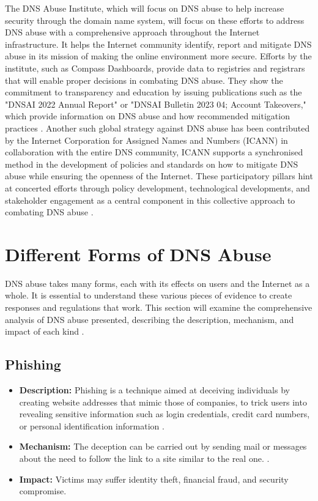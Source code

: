 The DNS Abuse Institute, which will focus on DNS abuse to help increase security through the domain name system, will focus on these efforts to address DNS abuse with a comprehensive approach throughout the Internet infrastructure. It helps the Internet community identify, report and mitigate DNS abuse in its mission of making the online environment more secure. Efforts by the institute, such as Compass Dashboards, provide data to registries and registrars that will enable proper decisions in combating DNS abuse. They show the commitment to transparency and education by issuing publications such as the "DNSAI 2022 Annual Report" or "DNSAI Bulletin 2023 04; Account Takeovers," which provide information on DNS abuse and how recommended mitigation practices \cite{dnsabuseinstitute2023}. Another such global strategy against DNS abuse has been contributed by the Internet Corporation for Assigned Names and Numbers (ICANN)\cite{icann2022dnsabuse} in collaboration with the entire DNS community, ICANN supports a synchronised method in the development of policies and standards on how to mitigate DNS abuse while ensuring the openness of the Internet. These participatory pillars hint at concerted efforts through policy development, technological developments, and stakeholder engagement as a central component in this collective approach to combating DNS abuse \cite{dnsai2022report}. 



\section{Different Forms of DNS Abuse}

DNS abuse takes many forms, each with its effects on users and the Internet as a whole. It is essential to understand these various pieces of evidence to create responses and regulations that work. This section will examine the comprehensive analysis of DNS abuse presented, describing the description, mechanism, and impact of each kind \cite{dotmagazine2022dnsabuse}.

\subsection{Phishing}
\begin{itemize}
    \item \textbf{Description:} Phishing is a technique aimed at deceiving individuals by creating website addresses that mimic those of companies, to trick users into revealing sensitive information such as login credentials, credit card numbers, or personal identification information \cite{webinarcare2023dnsstats}.
    \item \textbf{Mechanism:} The deception can be carried out by sending mail or messages about the need to follow the link to a site similar to the real one. \cite{jakobsson2006phishing}.
    \item \textbf{Impact:} Victims may suffer identity theft, financial fraud, and security compromise.
\end{itemize}

